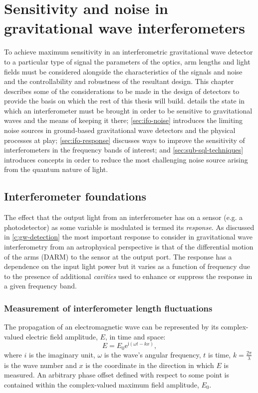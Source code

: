 \chapter{\label{c:instrumentation}Sensitivity and noise in gravitational wave interferometers}

To achieve maximum sensitivity in an interferometric gravitational wave detector to a particular type of signal the parameters of the optics, arm lengths and light fields must be considered alongside the characteristics of the signals and noise and the controllability and robustness of the resultant design. This chapter describes some of the considerations to be made in the design of detectors to provide the basis on which the rest of this thesis will build.  details the state in which an interferometer must be brought in order to be sensitive to gravitational waves and the means of keeping it there; \cref{sec:ifo-noise} introduces the limiting noise sources in ground-based gravitational wave detectors and the physical processes at play; \cref{sec:ifo-response} discusses ways to improve the sensitivity of interferometers in the frequency bands of interest; and \cref{sec:sub-sql-techniques} introduces concepts in order to reduce the most challenging noise source arising from the quantum nature of light.

\section{\label{sec:ifo-foundations}Interferometer foundations}
The effect that the output light from an interferometer has on a sensor (e.g. a photodetector) as some variable is modulated is termed its \emph{response}. As discussed in \cref{c:gw-detection} the most important response to consider in gravitational wave interferometry from an astrophysical perspective is that of the differential motion of the arms (\gls{DARM}) to the sensor at the output port. The response has a dependence on the input light power but it varies as a function of frequency due to the presence of additional \emph{cavities} used to enhance or suppress the response in a given frequency band.

\subsection{Measurement of interferometer length fluctuations}
The propagation of an electromagnetic wave can be represented by its complex-valued electric field amplitude, $E$, in time and space:
\begin{equation}
  \label{eq:em-propagation}
  E = E_0 \text{e}^{\text{i} \left( \omega t - kx \right)},
\end{equation}
where $i$ is the imaginary unit, $\omega$ is the wave's angular frequency, $t$ is time, $k = \frac{2 \pi}{\lambda}$ is the wave number and $x$ is the coordinate in the direction in which $E$ is measured. An arbitrary phase offset defined with respect to some point is contained within the complex-valued maximum field amplitude, $E_0$.

